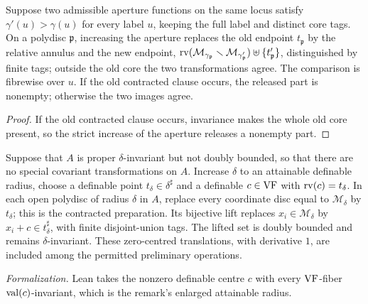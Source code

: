 \setcounter{theorem}{11}
\begin{remark}
\label{bigger-aper}
\leanok
{}
Suppose two admissible aperture functions on the same locus satisfy $\gamma'(u)>\gamma(u)$ for every label $u$, keeping the full label and distinct core tags. On a polydisc $\mathfrak p$, increasing the aperture replaces the old endpoint $t_{\mathfrak p}$ by the relative annulus and the new endpoint, $\operatorname{rv}(\mathcal{M}_{\gamma_{\mathfrak p}}\smallsetminus\mathcal{M}_{\gamma'_{\mathfrak p}})\uplus\{t'_{\mathfrak p}\}$, distinguished by finite tags; outside the old core the two transformations agree. The comparison is fibrewise over $u$. If the old contracted clause occurs, the released part is nonempty; otherwise the two images agree.
\end{remark}

\begin{proof}
\leanok
If the old contracted clause occurs, invariance makes the whole old core present, so the strict increase of the aperture releases a nonempty part.
\end{proof}

\setcounter{theorem}{12}
\begin{remark}
\label{spec-addendum}
\leanok
{}
Suppose that $A$ is proper $\delta$-invariant but not doubly bounded, so that there are no special covariant transformations on $A$. Increase $\delta$ to an attainable definable radius, choose a definable point $t_\delta\in\delta^\sharp$ and a definable $c\in\mathrm{VF}$ with $\operatorname{rv}(c)=t_\delta$. In each open polydisc of radius $\delta$ in $A$, replace every coordinate disc equal to $\mathcal{M}_\delta$ by $t_\delta$; this is the contracted preparation. Its bijective lift replaces $x_i\in\mathcal{M}_\delta$ by $x_i+c\in t_\delta^\sharp$, with finite disjoint-union tags. The lifted set is doubly bounded and remains $\delta$-invariant. These zero-centred translations, with derivative $1$, are included among the permitted preliminary operations.

\emph{Formalization.} Lean takes the nonzero definable centre $c$ with every $\mathrm{VF}$-fiber $\operatorname{val}(c)$-invariant, which is the remark's enlarged attainable radius.
\end{remark}


